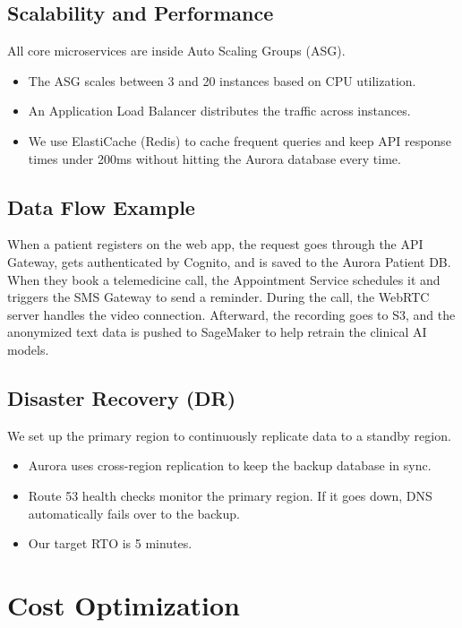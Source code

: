 \documentclass{article}
\begin{document}
\subsection{Scalability and Performance}
All core microservices are inside Auto Scaling Groups (ASG).
\begin{itemize}
    \item The ASG scales between 3 and 20 instances based on CPU utilization.
    \item An Application Load Balancer distributes the traffic across instances.
    \item We use ElastiCache (Redis) to cache frequent queries and keep API response times under 200ms without hitting the Aurora database every time.
\end{itemize}

\subsection{Data Flow Example}
When a patient registers on the web app, the request goes through the API Gateway, gets authenticated by Cognito, and is saved to the Aurora Patient DB. When they book a telemedicine call, the Appointment Service schedules it and triggers the SMS Gateway to send a reminder. During the call, the WebRTC server handles the video connection. Afterward, the recording goes to S3, and the anonymized text data is pushed to SageMaker to help retrain the clinical AI models.

\subsection{Disaster Recovery (DR)}
We set up the primary region to continuously replicate data to a standby region.
\begin{itemize}
    \item Aurora uses cross-region replication to keep the backup database in sync.
    \item Route 53 health checks monitor the primary region. If it goes down, DNS automatically fails over to the backup.
    \item Our target RTO is 5 minutes.
\end{itemize}

\vspace{8cm}
\section{Cost Optimization}
\end{document}
